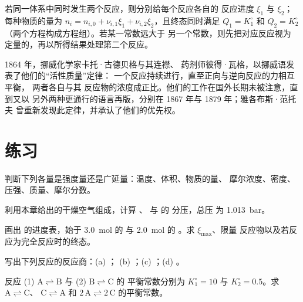 \begin{method}[两个同时发生的反应]\label{met:b1:extent-q-and-k:two-reactions}
若同一体系中同时发生两个反应，则分别给每个反应各自的
反应进度 $\xi_1$ 与 $\xi_2$；每种物质的量为 $n_i = n_{i,0} + \nu_{i,1}\xi_1
+ \nu_{i,2}\xi_2$，且终态同时满足 $Q_1 = K_1^\circ$ 和
$Q_2 = K_2^\circ$（两个方程构成方程组）。若某一常数远大于
另一个常数，则先把对应反应视为
定量的，再以所得结果处理第二个反应。
\end{method}

\begin{history}[质量作用定律，1864]
1864 年，挪威化学家卡托·古德贝格与其连襟、
药剂师彼得·瓦格，以挪威语发表了他们的“活性质量”定律：
一个反应持续进行，直至正向与逆向反应的力相互平衡，
两者各自与其
反应物的浓度成正比。他们的工作在国外长期未被注意，直到又以
另外两种更通行的语言再版，分别在 1867 年与 1879 年；雅各布斯·范托夫
曾重新发现此定律，并承认了他们的优先权。
\end{history}

\section{练习}

\begin{exercise}[$\star$]\label{exo:b1:extent-q-and-k:1}
判断下列各量是强度量还是广延量：温度、体积、物质的量、
摩尔浓度、密度、压强、质量、摩尔分数。
\end{exercise}

\begin{exercise}[$\star$]\label{exo:b1:extent-q-and-k:2}
利用本章给出的干燥空气组成，计算 、 与  的
分压，总压
为 \qty{1.013}{bar}。
\end{exercise}

\begin{exercise}[$\star$]\label{exo:b1:extent-q-and-k:3}
画出  的进度表，始于 \qty{3.0}{mol} 的
 与 \qty{2.0}{mol} 的 。求 $\xi_{\max}$、限量
反应物以及若反应为完全反应时的终态。
\end{exercise}

\begin{exercise}[$\star$]\label{exo:b1:extent-q-and-k:4}
写出下列反应的反应商：(a) ；
(b) ；(c) ；(d) 。
\end{exercise}

\begin{exercise}[$\star\star$]\label{exo:b1:extent-q-and-k:5}
反应 (1) $\mathrm{A \rightleftharpoons B}$ 与 (2) $\mathrm{B \rightleftharpoons C}$ 的
平衡常数分别为 $K_1^\circ = 10$ 与 $K_2^\circ = 0.5$。求 $\mathrm{A \rightleftharpoons C}$、
$\mathrm{C \rightleftharpoons A}$ 和 $\mathrm{2\,A \rightleftharpoons 2\,C}$ 的平衡常数。
\end{exercise}

